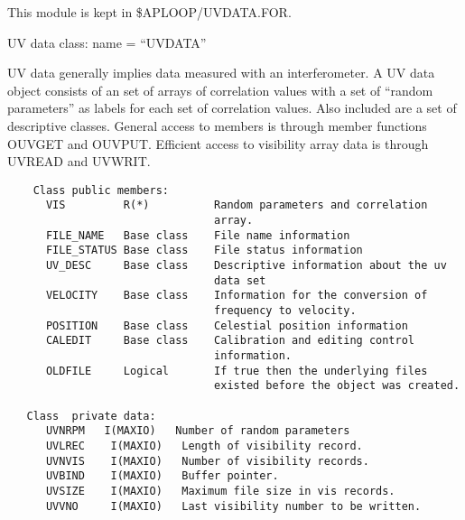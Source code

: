    This module is kept in \$APLOOP/UVDATA.FOR.

   UV data class: name = ``UVDATA''

    UV data generally implies data measured with an interferometer.
A UV data object consists of an set of arrays of correlation values
with a set of ``random parameters'' as labels for each set of
correlation values.  Also included are a set of descriptive
classes.  General access to members is through member functions
OUVGET and OUVPUT.  Efficient access to visibility array data
is through UVREAD and UVWRIT.
{\small\begin{verbatim}
    Class public members:
      VIS         R(*)          Random parameters and correlation
                                array.
      FILE_NAME   Base class    File name information
      FILE_STATUS Base class    File status information
      UV_DESC     Base class    Descriptive information about the uv
                                data set
      VELOCITY    Base class    Information for the conversion of
                                frequency to velocity.
      POSITION    Base class    Celestial position information
      CALEDIT     Base class    Calibration and editing control
                                information.
      OLDFILE     Logical       If true then the underlying files
                                existed before the object was created.

   Class  private data:
      UVNRPM   I(MAXIO)   Number of random parameters
      UVLREC    I(MAXIO)   Length of visibility record.
      UVNVIS    I(MAXIO)   Number of visibility records.
      UVBIND    I(MAXIO)   Buffer pointer.
      UVSIZE    I(MAXIO)   Maximum file size in vis records.
      UVVNO     I(MAXIO)   Last visibility number to be written.


\end{verbatim}}
